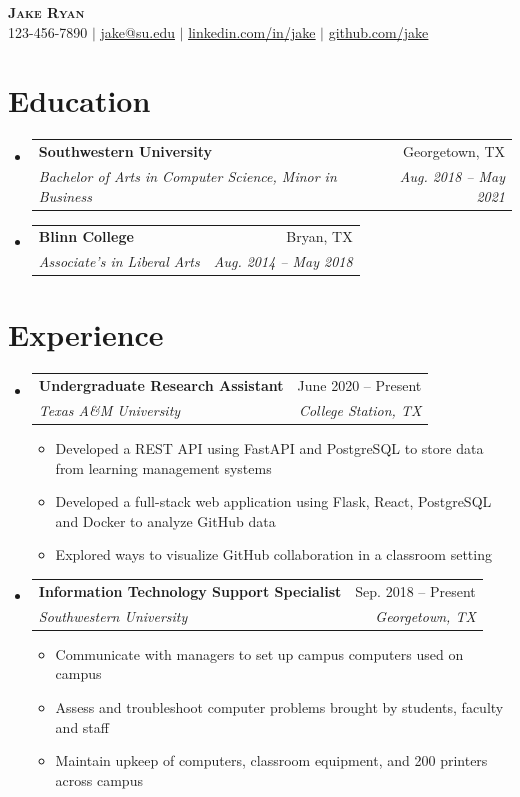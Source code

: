 \documentclass[letterpaper,11pt]{article}
\makeatletter
\newcommand{\resumeItem}[1]{
  \item\small{
    {#1 \vspace{-2pt}}
  }
}
\newcommand{\resumeSubheading}[4]{
  \vspace{-2pt}\item
    \begin{tabular*}{0.97\textwidth}[t]{l@{\extracolsep{\fill}}r}
      \textbf{#1} & #2 \\
      \textit{\small#3} & \textit{\small #4} \\
    \end{tabular*}\vspace{-7pt}
}
\newcommand{\resumeSubHeadingListStart}{\begin{itemize}[leftmargin=0.15in, label={}]}
\newcommand{\resumeSubHeadingListEnd}{\end{itemize}}
\newcommand{\resumeItemListStart}{\begin{itemize}}
\newcommand{\resumeItemListEnd}{\end{itemize}\vspace{-5pt}}
\makeatother
\begin{document}
\begin{center}
    \textbf{\Huge \scshape Jake Ryan} \\ \vspace{1pt}
    \small 123-456-7890 $|$ \href{mailto:jake@su.edu}{\underline{jake@su.edu}} $|$ 
    \href{https://linkedin.com/in/jake}{\underline{linkedin.com/in/jake}} $|$
    \href{https://github.com/jake}{\underline{github.com/jake}}
\end{center}


\section{Education}
  \resumeSubHeadingListStart
    \resumeSubheading
      {Southwestern University}{Georgetown, TX}
      {Bachelor of Arts in Computer Science, Minor in Business}{Aug. 2018 -- May 2021}
    \resumeSubheading
      {Blinn College}{Bryan, TX}
      {Associate's in Liberal Arts}{Aug. 2014 -- May 2018}
  \resumeSubHeadingListEnd


\section{Experience}
  \resumeSubHeadingListStart

    \resumeSubheading
      {Undergraduate Research Assistant}{June 2020 -- Present}
      {Texas A\&M University}{College Station, TX}
      \resumeItemListStart
        \resumeItem{Developed a REST API using FastAPI and PostgreSQL to store data from learning management systems}
        \resumeItem{Developed a full-stack web application using Flask, React, PostgreSQL and Docker to analyze GitHub data}
        \resumeItem{Explored ways to visualize GitHub collaboration in a classroom setting}
      \resumeItemListEnd
      
    \resumeSubheading
      {Information Technology Support Specialist}{Sep. 2018 -- Present}
      {Southwestern University}{Georgetown, TX}
      \resumeItemListStart
        \resumeItem{Communicate with managers to set up campus computers used on campus}
        \resumeItem{Assess and troubleshoot computer problems brought by students, faculty and staff}
        \resumeItem{Maintain upkeep of computers, classroom equipment, and 200 printers across campus}
      \resumeItemListEnd

  \resumeSubHeadingListEnd


\end{document}
